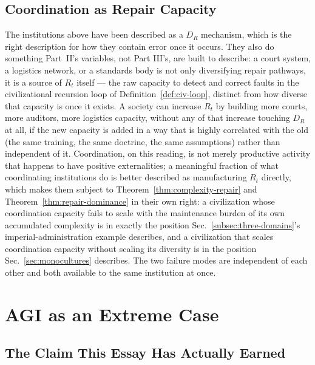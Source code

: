 \documentclass[11pt,a4paper]{article}
\theoremstyle{plain}
\theoremstyle{definition}
\theoremstyle{remark}
\newcommand{\DR}{D_R}
\begin{document}
\subsection{Coordination as Repair Capacity}
\label{subsec:coordination-repair}

The institutions above have been described as a $\DR$ mechanism, which is the right description for how they contain error once it occurs. They also do something Part~II's variables, not Part III's, are built to describe: a court system, a logistics network, or a standards body is not only diversifying repair pathways, it is a source of $R_t$ itself — the raw capacity to detect and correct faults in the civilizational recursion loop of Definition~\ref{def:civ-loop}, distinct from how diverse that capacity is once it exists. A society can increase $R_t$ by building more courts, more auditors, more logistics capacity, without any of that increase touching $\DR$ at all, if the new capacity is added in a way that is highly correlated with the old (the same training, the same doctrine, the same assumptions) rather than independent of it. Coordination, on this reading, is not merely productive activity that happens to have positive externalities; a meaningful fraction of what coordinating institutions do is better described as manufacturing $R_t$ directly, which makes them subject to Theorem~\ref{thm:complexity-repair} and Theorem~\ref{thm:repair-dominance} in their own right: a civilization whose coordination capacity fails to scale with the maintenance burden of its own accumulated complexity is in exactly the position Sec.~\ref{subsec:three-domains}'s imperial-administration example describes, and a civilization that scales coordination capacity without scaling its diversity is in the position Sec.~\ref{sec:monocultures} describes. The two failure modes are independent of each other and both available to the same institution at once.

\section{AGI as an Extreme Case}
\label{sec:agi-extreme-case}

\subsection{The Claim This Essay Has Actually Earned}
\label{subsec:earned-claim}
\end{document}
